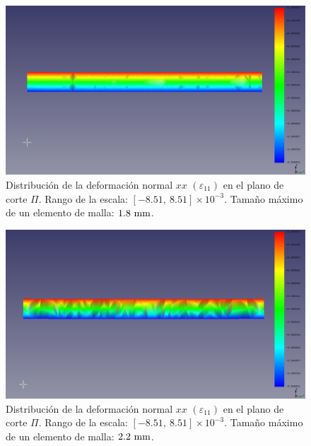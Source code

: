 \begin{figure}[H]
    \centering
    \includegraphics[width=\textwidth]{figures/resultados/strain_vector_x_18.pdf}
    \caption{Distribución de la deformación normal $xx$ $(\varepsilon_{11})$ en el plano de corte $\Pi$. Rango de la escala: $[-8.51, \ 8.51] \times 10^{-3}$. Tamaño máximo de un elemento de malla: $1.8 \ \milli\meter$.}
    \label{fig:strain_vector_x_18}
\end{figure}

\begin{figure}[H]
    \centering
    \includegraphics[width=\textwidth]{figures/resultados/strain_vector_x_22.pdf}
    \caption{Distribución de la deformación normal $xx$ $(\varepsilon_{11})$ en el plano de corte $\Pi$. Rango de la escala: $[-8.51, \ 8.51] \times 10^{-3}$. Tamaño máximo de un elemento de malla: $2.2 \ \milli\meter$.}
    \label{fig:strain_vector_x_22}
\end{figure}

